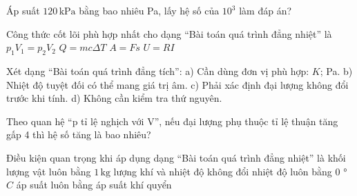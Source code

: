 \begin{ex}
Áp suất $120\,\text{kPa}$ bằng bao nhiêu Pa, lấy hệ số của $10^3$ làm đáp án?
\end{ex}

\begin{ex}
Công thức cốt lõi phù hợp nhất cho dạng “Bài toán quá trình đẳng nhiệt” là
\choice
{\True $p_1V_1=p_2V_2$}
{$Q=mc\Delta T$}
{$A=Fs$}
{$U=RI$}
\end{ex}

\begin{ex}
Xét dạng “Bài toán quá trình đẳng tích”: a) Cần dùng đơn vị phù hợp: $K$; Pa. b) Nhiệt độ tuyệt đối có thể mang giá trị âm. c) Phải xác định đại lượng không đổi trước khi tính. d) Không cần kiểm tra thứ nguyên.
\choiceTF

\end{ex}

\begin{ex}
Theo quan hệ “p tỉ lệ nghịch với V”, nếu đại lượng phụ thuộc tỉ lệ thuận tăng gấp 4 thì hệ số tăng là bao nhiêu?
\end{ex}

\begin{ex}
Điều kiện quan trọng khi áp dụng dạng “Bài toán quá trình đẳng nhiệt” là
\choice
{khối lượng vật luôn bằng $1\,\text{kg}$}
{\True lượng khí và nhiệt độ không đổi}
{nhiệt độ luôn bằng 0 ° $C$}
{áp suất luôn bằng áp suất khí quyển}
\end{ex}

